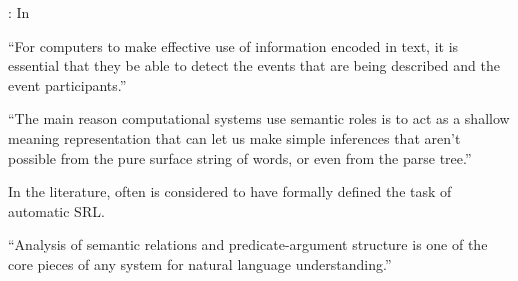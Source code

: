 \begin{description}
  \item[\textbf{Fixed expressions}]: In
  \item
  \item
\end{description}

``For computers to make effective use of information encoded in text, it is essential that
they be able to detect the events that are being described and the event participants.''
\citep{palmer2010semantic}

``The main reason computational systems use semantic roles is to act as a shallow meaning
representation that can let us make simple inferences that aren’t possible from the pure surface
string of words, or even from the parse tree.'' \cite[p.~375]{jurafsky2019speech}

In the literature, often \cite{gildea2002automatic} is considered to have formally defined the
task of automatic SRL.

``Analysis of semantic relations and predicate-argument structure is one of the core pieces of any
system for natural language understanding.'' \citep{palmer2010semantic}

